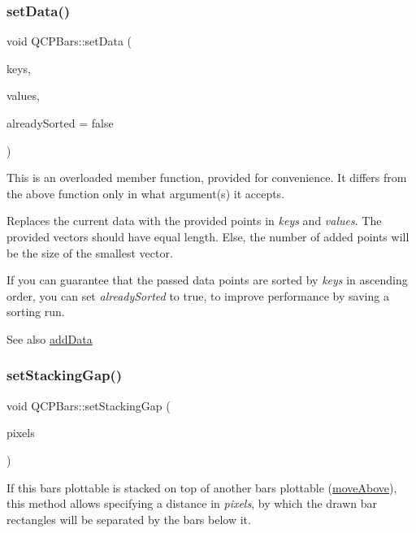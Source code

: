 \subsubsection{\texorpdfstring{set\+Data()}{setData()}\hspace{0.1cm}{\footnotesize\ttfamily [2/2]}}
{\footnotesize\ttfamily void Q\+C\+P\+Bars\+::set\+Data (\begin{DoxyParamCaption}\item[{const \hyperlink{class_q_vector}{Q\+Vector}$<$ double $>$ \&}]{keys,  }\item[{const \hyperlink{class_q_vector}{Q\+Vector}$<$ double $>$ \&}]{values,  }\item[{bool}]{already\+Sorted = {\ttfamily false} }\end{DoxyParamCaption})}

This is an overloaded member function, provided for convenience. It differs from the above function only in what argument(s) it accepts.

Replaces the current data with the provided points in {\itshape keys} and {\itshape values}. The provided vectors should have equal length. Else, the number of added points will be the size of the smallest vector.

If you can guarantee that the passed data points are sorted by {\itshape keys} in ascending order, you can set {\itshape already\+Sorted} to true, to improve performance by saving a sorting run.

\begin{DoxySeeAlso}{See also}
\hyperlink{class_q_c_p_bars_a323d6970d6d6e3166d89916a7f60f733}{add\+Data} 
\end{DoxySeeAlso}
\mbox{\label{class_q_c_p_bars_aeacf7561afb1c70284b22822b57c7bb5}} 
\subsubsection{\texorpdfstring{set\+Stacking\+Gap()}{setStackingGap()}}
{\footnotesize\ttfamily void Q\+C\+P\+Bars\+::set\+Stacking\+Gap (\begin{DoxyParamCaption}\item[{double}]{pixels }\end{DoxyParamCaption})}

If this bars plottable is stacked on top of another bars plottable (\hyperlink{class_q_c_p_bars_ac22e00a6a41509538c21b04f0a57318c}{move\+Above}), this method allows specifying a distance in {\itshape pixels}, by which the drawn bar rectangles will be separated by the bars below it. \mbox{\label{class_q_c_p_bars_afec6116579d44d5b706e0fa5e5332507}} 
